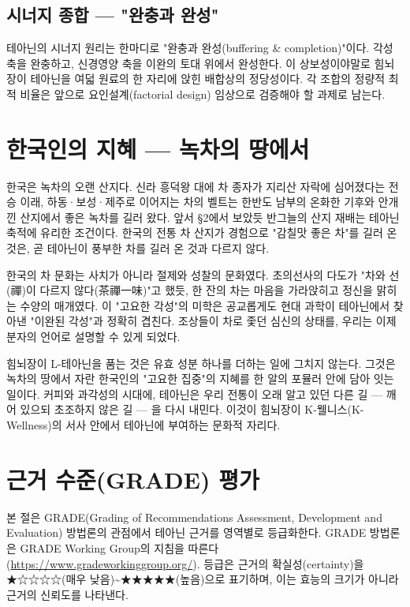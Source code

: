 \documentclass[12pt,oneside]{book}
\begin{document}
\subsection{시너지 종합 — "완충과 완성"}

테아닌의 시너지 원리는 한마디로 "완충과 완성(buffering \& completion)"이다. 각성 축을 완충하고, 신경영양 축을 이완의 토대 위에서 완성한다. 이 상보성이야말로 힘뇌장이 테아닌을 여덟 원료의 한 자리에 앉힌 배합상의 정당성이다. 각 조합의 정량적 최적 비율은 앞으로 요인설계(factorial design) 임상으로 검증해야 할 과제로 남는다.

\section{한국인의 지혜 — 녹차의 땅에서}

한국은 녹차의 오랜 산지다. 신라 흥덕왕 대에 차 종자가 지리산 자락에 심어졌다는 전승 이래, 하동·보성·제주로 이어지는 차의 벨트는 한반도 남부의 온화한 기후와 안개 낀 산지에서 좋은 녹차를 길러 왔다. 앞서 §2에서 보았듯 반그늘의 산지 재배는 테아닌 축적에 유리한 조건이다. 한국의 전통 차 산지가 경험으로 "감칠맛 좋은 차"를 길러 온 것은, 곧 테아닌이 풍부한 차를 길러 온 것과 다르지 않다.

한국의 차 문화는 사치가 아니라 절제와 성찰의 문화였다. 초의선사의 다도가 "차와 선(禪)이 다르지 않다(茶禪一味)"고 했듯, 한 잔의 차는 마음을 가라앉히고 정신을 맑히는 수양의 매개였다. 이 "고요한 각성"의 미학은 공교롭게도 현대 과학이 테아닌에서 찾아낸 "이완된 각성"과 정확히 겹친다. 조상들이 차로 좇던 심신의 상태를, 우리는 이제 분자의 언어로 설명할 수 있게 되었다.

힘뇌장이 L-테아닌을 품는 것은 유효 성분 하나를 더하는 일에 그치지 않는다. 그것은 녹차의 땅에서 자란 한국인의 "고요한 집중"의 지혜를 한 알의 포뮬러 안에 담아 잇는 일이다. 커피와 과각성의 시대에, 테아닌은 우리 전통이 오래 알고 있던 다른 길 — 깨어 있으되 초조하지 않은 길 — 을 다시 내민다. 이것이 힘뇌장이 K-웰니스(K-Wellness)의 서사 안에서 테아닌에 부여하는 문화적 자리다.

\section{근거 수준(GRADE) 평가}

본 절은 GRADE(Grading of Recommendations Assessment, Development and Evaluation) 방법론의 관점에서 테아닌 근거를 영역별로 등급화한다. GRADE 방법론은 GRADE Working Group의 지침을 따른다(\url{https://www.gradeworkinggroup.org/}). 등급은 근거의 확실성(certainty)을 ★☆☆☆☆(매우 낮음)\textasciitilde{}★★★★★(높음)으로 표기하며, 이는 효능의 크기가 아니라 근거의 신뢰도를 나타낸다.
\end{document}
